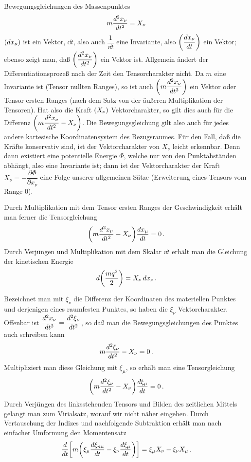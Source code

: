 Bewegungsgleichungen des Massenpunktes
\begin{align}
m {\dfrac{d{^2 x_{\nu}}}{d{t^2}}} = X_{\nu}
\label{eq:14}
\end{align}
${\left(d x_{\nu}\right)}$ ist ein Vektor, $\dd t$, also auch $\dfrac{1}{\dd t}$ eine 
Invariante, also ${\left(\dfrac{d x_{\nu}}{d t}\right)}$ ein Vektor; ebenso zeigt 
man, daß ${\left(\dfrac{d^2 x_{\nu}}{d t^2}\right)}$ ein Vektor ist. Allgemein 
ändert der Differentiationsprozeß nach der Zeit den Tensorcharakter nicht. 
Da $m$ eine Invariante ist (Tensor nullten Ranges), so ist auch ${\left(m 
\dfrac{d^2 x_{\nu}}{d t^2}\right)}$ ein Vektor oder Tensor ersten Ranges (nach
dem Satz von der äußeren Multiplikation der Tensoren). Hat also die Kraft 
${\left(X_{\nu}\right)}$ Vektorcharakter, so gilt dies auch für die Differenz
${\left(m \dfrac{d^2 x_{\nu}}{d t^2} - X_{\nu}\right)}$. Die Bewegungsgleichung gilt 
also auch für jedes andere kartesische Koordinatensystem des Bezugsraumes. Für 
den Fall, daß die Kräfte konservativ sind, ist der Vektorcharakter von 
$X_{\nu}$ leicht erkennbar. Denn dann existiert eine potentielle Energie 
$\Phi$, welche nur von den Punktabständen abhängt, also eine Invariante ist; 
dann ist der Vektorcharakter der Kraft $X_{\nu} = - \dfrac{\partial 
\Phi}{\partial x_{\nu}}$ eine Folge unserer allgemeinen Sätze (Erweiterung 
eines Tensors vom Range 0).

Durch Multiplikation mit dem Tensor ersten Ranges der Geschwindigkeit erhält man 
ferner die Tensorgleichung
\begin{align*}
{\left(m {\dfrac{d{^2 x_{\nu}}}{d{t^2}}} - X_{\nu}\right)} {\dfrac{d{x_{\mu}}}{d{t}}} = 0\,.
\end{align*}
Durch Verjüngen und Multiplikation mit dem Skalar $\dd t$ erhält man die 
Gleichung der kinetischen Energie
\begin{align*}
d{\left(\frac{m q^2}{2}\right)} = X_{\nu}\,d x_{\nu}\,.
\end{align*}

Bezeichnet man mit $\xi_{\nu}$ die Differenz der Koordinaten des materiellen 
Punktes und derjenigen eines raumfesten Punktes, so haben die $\xi_{\nu}$ 
Vektorcharakter. Offenbar ist ${\dfrac{d{^2 x_{\nu}}}{d{t^2}}} = {\dfrac{d{^2 
\xi_{\nu}}}{d{t^2}}}$, so daß man die Bewegungsgleichungen des Punktes auch 
schreiben kann
\begin{align*}
m {\dfrac{d{^2 \xi_{\nu}}}{d{t^2}}} - X_{\nu} = 0\,.
\end{align*}
Multipliziert man diese Gleichung mit $\xi_{\mu}$, so erhält man eine 
Tensorgleichung
\begin{align*}
{\left(m {\dfrac{d{^2 \xi_{\nu}}}{d{t^2}}} - X_{\nu}\right)} {\dfrac{d{\xi_{\mu}}}{d{t}}} = 0\,.
\end{align*}
Durch Verjüngen des linksstehenden Tensors und Bilden des zeitlichen Mittels 
gelangt man zum Virialsatz, worauf wir nicht näher eingehen. Durch Vertauschung 
der Indizes und nachfolgende Subtraktion erhält man nach einfacher Umformung den 
Momentensatz
\begin{align}
{\dfrac{d{}}{d{t}}}{\left[m{\left(\xi_{\mu}{\dfrac{d{\xi_{nu}}}{d{t}}}-
\xi_{\nu}{\dfrac{d{\xi_{\mu}}}{d{t}}}\right)}\right]}
= \xi_{\mu} X_{\nu} - \xi_{\nu} X_{\mu}\,.
\label{eq:15}
\end{align}

